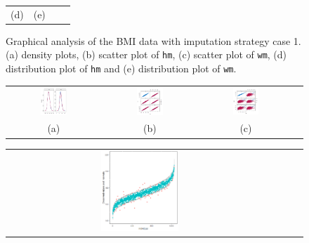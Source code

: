 \documentclass[12pt, fullpage, a4paper]{article}
\begin{document}
\begin{figure} [ht!]
\begin{tabular}{cccc}
		\textnormal{(d)}  & \textnormal{(e)}  \\[6pt]
	\end{tabular}
	\caption{Graphical analysis of the BMI data with imputation strategy case 1. (a) density plots, (b) scatter plot of \texttt{hm}, (c) scatter plot of \texttt{wm}, (d) distribution plot of \texttt{hm} and (e) distribution plot of \texttt{wm}.}
	\label{fig6_9}
\end{figure}


\begin{figure} [ht!]
	\centering
	\begin{tabular}{cccc}
		\includegraphics[width=0.3\textwidth]{plots/densitycase2} &
		\includegraphics[width=0.3\textwidth]{plots/scattercase2hm} &
		\includegraphics[width=0.3\textwidth]{plots/scattercase2wm} \\
		\textnormal{(a)}  & \textnormal{(b)} & \textnormal{(c)}  \\[6pt]
	\end{tabular}
	\begin{tabular}{cccc}
		\includegraphics[width=0.3\textwidth]{plots/distributioncase2hm} &

\end{tabular}
\end{figure}
\end{document}
